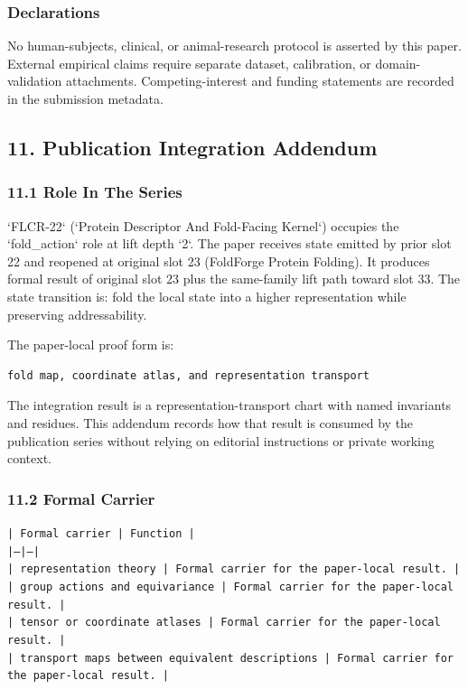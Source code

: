 \documentclass[11pt]{article}
\begin{document}
\subsubsection*{Declarations}

No human-subjects, clinical, or animal-research protocol is asserted by this
paper. External empirical claims require separate dataset, calibration, or
domain-validation attachments. Competing-interest and funding statements are recorded in the submission metadata.

\subsection*{11. Publication Integration Addendum}

\subsubsection*{11.1 Role In The Series}

`FLCR-22` (`Protein Descriptor And Fold-Facing Kernel`) occupies the `fold\_action` role at lift depth `2`.
The paper receives state emitted by prior slot 22 and reopened at original slot 23 (FoldForge Protein Folding). It produces formal result of original slot 23 plus the same-family lift path toward slot 33. The state transition is:
fold the local state into a higher representation while preserving addressability.

The paper-local proof form is:

\begin{verbatim}
fold map, coordinate atlas, and representation transport
\end{verbatim}

The integration result is a representation-transport chart with named invariants and residues. This addendum records how that result is
consumed by the publication series without relying on editorial instructions or
private working context.

\subsubsection*{11.2 Formal Carrier}

\noindent\texttt{| Formal carrier | Function |}\\
\noindent\texttt{|---|---|}\\
\noindent\texttt{| representation theory | Formal carrier for the paper-local result. |}\\
\noindent\texttt{| group actions and equivariance | Formal carrier for the paper-local result. |}\\
\noindent\texttt{| tensor or coordinate atlases | Formal carrier for the paper-local result. |}\\
\noindent\texttt{| transport maps between equivalent descriptions | Formal carrier for the paper-local result. |}\\
\end{document}
